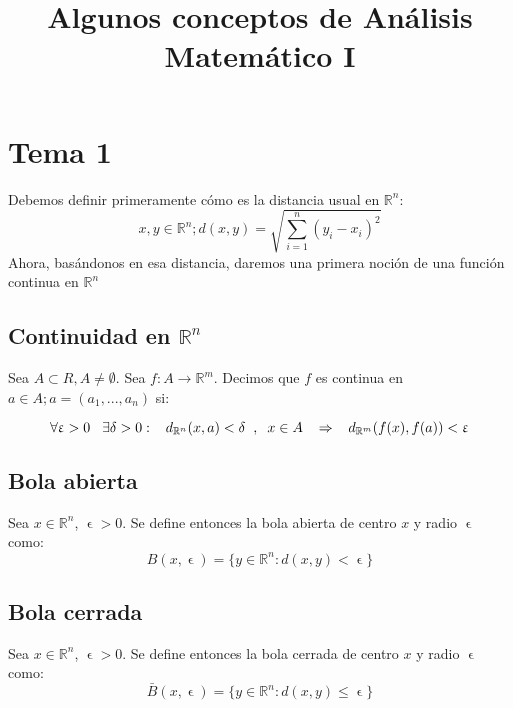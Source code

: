 \documentclass[11pt]{article}
\title{\textbf{Algunos conceptos de Análisis Matemático I}}
\date{}
\begin{document}
\maketitle



\section*{Tema 1}

Debemos definir primeramente cómo es la distancia usual en $\mathbb{R}^n$:
\[
x,y \in \mathbb{R}^n ; d(x,y) = \sqrt{\sum_{i=1}^n (y_i - x_i)^2}
\]
Ahora, basándonos en esa distancia, daremos una primera noción de una función continua en $\mathbb{R}^n$


\subsection*{Continuidad en $\mathbb{R}^n$}
Sea $A \subset R, A \neq \emptyset$. Sea $f: A \to \mathbb{R}^m$. Decimos que $f$ es continua en $a \in A; a = (a_1,...,a_n)$ si:

\[
\forall \upvarepsilon > 0  \hspace{0.3cm}\exists \delta > 0 :\hspace{0.3cm} d_{\mathbb{R}^n}(x,a)< \delta \hspace{0.2cm} ,\hspace{0.2cm} x \in A\hspace{0.3cm} \Rightarrow \hspace{0.3cm} d_{\mathbb{R}^m}(f(x),f(a))< \upvarepsilon
\]


\subsection*{Bola abierta}

Sea $x\in \mathbb{R}^n$, $\upvarepsilon > 0$. Se define entonces la bola abierta de centro $x$ y radio $\upvarepsilon$ como:
\[
B(x,\upvarepsilon) = \{ y \in \mathbb{R}^n : d(x,y) < \upvarepsilon\}
\]



\subsection*{Bola cerrada}

Sea $x\in \mathbb{R}^n$, $\upvarepsilon > 0$. Se define entonces la bola cerrada de centro $x$ y radio $\upvarepsilon$ como:
\[
\bar{B}(x,\upvarepsilon) = \{ y \in \mathbb{R}^n : d(x,y) \leq \upvarepsilon\}
\]
\end{document}
